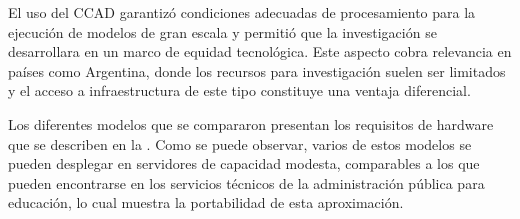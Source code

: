 El uso del CCAD garantizó condiciones adecuadas de procesamiento para la ejecución de modelos de gran escala y permitió que la investigación se desarrollara en un marco de equidad tecnológica. Este aspecto cobra relevancia en países como Argentina, donde los recursos para investigación suelen ser limitados y el acceso a infraestructura de este tipo constituye una ventaja diferencial.

Los diferentes modelos que se compararon presentan los requisitos de hardware que se describen en la . Como se puede observar, varios de estos modelos se pueden desplegar en servidores de capacidad modesta, comparables a los que pueden encontrarse en los servicios técnicos de la administración pública para educación, lo cual muestra la portabilidad de esta aproximación.

\begin{table}[H]
\caption{Requerimientos de memoria en GPU según precisión fp32 y fp16 de los modelos}
\label{tab:modelos-peso}
\end{table}